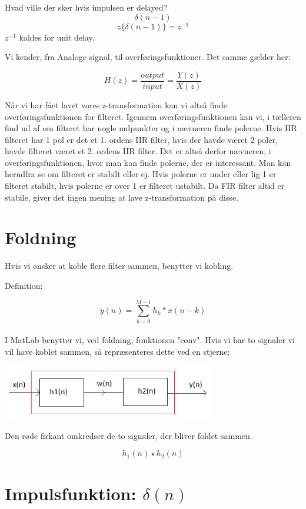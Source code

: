 \documentclass[12pt, letterpaper]{article}
\begin{document}
Hvad ville der sker hvis impulsen er delayed? 
$$\delta(n-1)$$
$$ z{\{\delta(n-1)}\}=z^{-1}$$
$z^{-1}$ kaldes for unit delay. 

Vi kender, fra Analoge signal, til overføringsfunktioner. Det samme gælder her: 

$$ H(z)= \frac{output}{input} = \frac{Y(z)}{X(z)}$$

Når vi har fået lavet vores z-transformation kan vi altså finde overføringsfunktionen for filteret. 
Igennem overføringsfunktionen kan vi, i tælleren find ud af om filteret har nogle nulpunkter og i nævneren finde polerne. 
Hvis IIR filteret har 1 pol er det et 1. ordens IIR filter, hvis der havde været 2 poler, havde filteret været et 2. ordens IIR filter. Det er altså derfor nævneren, i overføringsfunktionen, hvor man kan finde polerne, der er interessant. Man kan herudfra se om filteret er stabilt eller ej. Hvis polerne er under eller lig 1 er filteret stabilt, hvis polerne er over 1 er filteret ustabilt. 
Da FIR filter altid er stabile, giver det ingen mening at lave z-transformation på disse. 


\section{Foldning}
Hvis vi ønsker at koble flere filter sammen, benytter vi kobling. 

Definition: 

$$ y(n)= \sum\limits_{k=0}^{M-1} h_k * x(n-k) $$ \\

I MatLab benytter vi, ved foldning, funktionen "conv". 
Hvis vi har to signaler vi vil have koblet sammen, så repræsenteres dette ved en stjerne: 

\begin{center}
\includegraphics[width=0.7\textwidth]{billeder/foldning}
\end{center}

Den røde firkant omkredser de to signaler, der bliver foldet sammen. 

$$ h_1(n)\star h_2(n) $$


\section{Impulsfunktion: $\delta(n)$}
\end{document}
